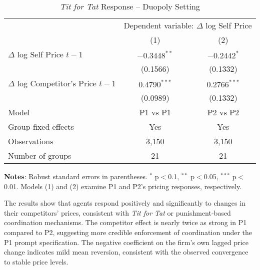 \begin{table}[htpb!]
    \centering
    \caption{\emph{Tit for Tat} Response -- Duopoly Setting}
    \label{tab:fe_duopoly}
    \begin{threeparttable}
    {\small
    \begin{tabular}{lcc}
    \toprule
    & \multicolumn{2}{c}{Dependent variable: $\Delta$ log Self Price} \\
    \cmidrule(lr){2-3}
    & (1) & (2) \\
    \midrule
    $\Delta$ log Self Price $t-1$         & $-0.3448^{**}$ & $-0.2442^{*}$  \\
                             & (0.1566)       & (0.1332)       \\
    $\Delta$ log Competitor's Price $t-1$ & $0.4790^{***}$ & $0.2766^{***}$ \\
                             & (0.0989)       & (0.1332)       \\
    \midrule
    Model                    & P1 vs P1       & P2 vs P2       \\          
    Group fixed effects      & Yes            & Yes            \\
    \midrule
    Observations             & 3,150          & 3,150          \\
    Number of groups         & 21             & 21             \\
    \bottomrule
    \end{tabular}
    }
    \begin{tablenotes}[flushleft]
    \footnotesize
    \item \textbf{Notes}: Robust standard errors in parentheses. $^{*}$ p$<$0.1, $^{**}$ p$<$0.05, $^{***}$ p$<$0.01. Models (1) and (2) examine P1 and P2's pricing responses, respectively.
    \end{tablenotes}
    \end{threeparttable}
\end{table}

The results show that agents respond positively and significantly to changes in their competitors' prices, consistent with \emph{Tit for Tat} or punishment-based coordination mechanisms. The competitor effect is nearly twice as strong in P1 compared to P2, suggesting more credible enforcement of coordination under the P1 prompt specification. The negative coefficient on the firm's own lagged price change indicates mild mean reversion, consistent with the observed convergence to stable price levels.

